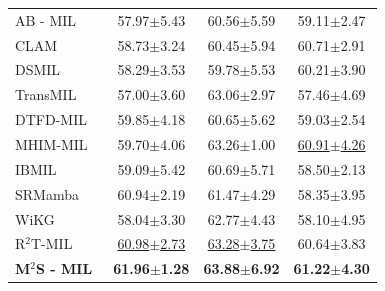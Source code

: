 {\begin{xltabular}{\textwidth}{XCCC}
  AB - MIL~\cite{ilse2018attention}& 57.97$\pm$5.43 & 60.56$\pm$5.59 & 59.11$\pm$2.47 \\
  CLAM~\cite{lu2021data}& 58.73$\pm$3.24 & 60.45$\pm$5.94 & 60.71$\pm$2.91\\
  DSMIL ~\cite{li2021dual} & 58.29$\pm$3.53 & 59.78$\pm$5.53 & 60.21$\pm$3.90  \\
  TransMIL~\cite{shao2021transmil} & 57.00$\pm$3.60 & 63.06$\pm$2.97 & 57.46$\pm$4.69\\
  DTFD-MIL~\cite{zhang2022dtfd} & 59.85$\pm$4.18 & 60.65$\pm$5.62 & 59.03$\pm$2.54\\
  MHIM-MIL ~\cite{tang2023multiple} & 59.70$\pm$4.06 & 63.26$\pm$1.00 & \underline{60.91$\pm$4.26}\\
  IBMIL~\cite{lin2023interventional} & 59.09$\pm$5.42 & 60.69$\pm$5.71 & 58.50$\pm$2.13\\
  SRMamba ~\cite{yang2024mambamil} & 60.94$\pm$2.19 & 61.47$\pm$4.29 & 58.35$\pm$3.95\\
  WiKG ~\cite{li2024dynamic} & 58.04$\pm$3.30 & 62.77$\pm$4.43 & 58.10$\pm$4.95 \\
  R$^2$T-MIL ~\cite{tang2024feature} & \underline{60.98$\pm$2.73} & \underline{63.28$\pm$3.75} & 60.64$\pm$3.83 \\
  \textbf{M$^2$S - MIL} & \textbf{61.96$\pm$1.28} & \textbf{63.88$\pm$6.92} & \textbf{61.22$\pm$4.30}\\
\end{xltabular}}


